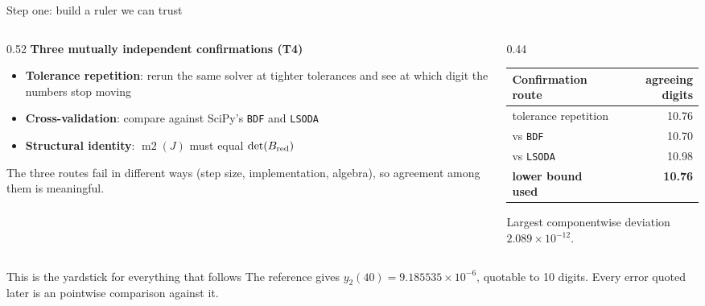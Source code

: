 \documentclass[aspectratio=169,10pt]{beamer}
\newcommand{\tab}[1]{\textbf{#1}}
\newcommand{\code}[1]{\texttt{\small #1}}
\begin{document}
\begin{frame}{Step one: build a ruler we can trust}
  \begin{columns}[T]
    \begin{column}{0.52\textwidth}
      \textbf{Three mutually independent confirmations (\tab{T4})}\\[0.3em]
      \begin{itemize}
        \item \textbf{Tolerance repetition}: rerun the same solver at tighter
              tolerances and see at which digit the numbers stop moving
        \item \textbf{Cross-validation}: compare against SciPy's \code{BDF}
              and \code{LSODA}
        \item \textbf{Structural identity}: $\operatorname{m2}(J)$ must equal
              $\det(B_{\rm red})$
      \end{itemize}
      \vspace{0.2em}

      \footnotesize The three routes fail in different ways (step size,
      implementation, algebra), so agreement among them is meaningful.
    \end{column}
    \begin{column}{0.44\textwidth}
      {\small
      \begin{tabular}{@{}lr@{}}
        \toprule
        Confirmation route & agreeing digits \\
        \midrule
        tolerance repetition & 10.76 \\
        vs \code{BDF}        & 10.70 \\
        vs \code{LSODA}      & 10.98 \\
        \midrule
        \textbf{lower bound used} & \textbf{10.76} \\
        \bottomrule
      \end{tabular}}
      \vspace{0.4em}

      \footnotesize Largest componentwise deviation $2.089\times10^{-12}$.
    \end{column}
  \end{columns}

  \vspace{0.4em}
  \begin{block}{This is the yardstick for everything that follows}
    The reference gives $y_2(40)=9.185535\times10^{-6}$, quotable to 10 digits.
    Every error quoted later is an \alert{pointwise comparison against it}.
  \end{block}
\end{frame}
\end{document}
